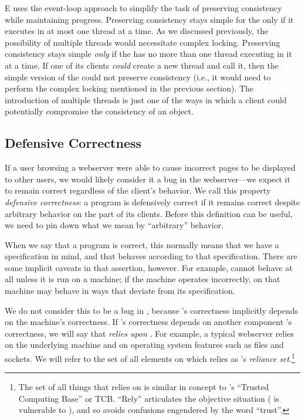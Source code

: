 \documentclass{llncs}
\begin{document}
E uses the event-loop approach to simplify the task of preserving
consistency while maintaining progress. Preserving consistency stays
simple for the  only if it executes in at most one
thread at a time.  As we discussed previously, the possibility of
multiple threads would necessitate complex locking. Preserving
consistency stays simple \emph{only} if the  has no
more than one thread executing in it at a time.  If one of its clients
\emph{could} create a new thread and call it, then the simple version
of the  could not preserve consistency (i.e., it
would need to perform the complex locking mentioned in the previous
section). The introduction of multiple threads is just one of the ways
in which a client could potentially compromise the consistency of an
object.


\subsection{Defensive Correctness}

If a user browsing a webserver were able to cause incorrect pages to
be displayed to other users, we would likely consider it a bug in the
webserver---we expect it to remain correct regardless of the client's
behavior.  We call this property \emph{defensive correctness}: a
program  is defensively correct if it remains correct despite
arbitrary behavior on the part of its clients.  Before this definition
can be useful, we need to pin down what we mean by ``arbitrary''
behavior.

When we say that a program  is correct, this normally means
that we have a specification in mind, and that  behaves
according to that specification.  There are some implicit caveats in
that assertion, however. For example,  cannot behave at all
unless it is run on a machine; if the machine operates incorrectly,
 on that machine may behave in ways that deviate from its
specification.  

We do not consider this to be a bug in , because 's
correctness implicitly depends on the machine's correctness.  If
's correctness depends on another component 's
correctness, we will say that  \emph{relies upon} .
For example, a typical webserver relies on the underlying machine and
on operating system features such as files and sockets.  We will refer
to the set of all elements on which  relies as 's
\emph{reliance set}.\footnote{
%
     The set of all things that  relies on is similar in
     concept to 's ``Trusted Computing Base'' or TCB. ``Rely''
     articulates the objective situation ( is vulnerable to
     ), and so avoids confusions engendered by the word
     ``trust''.}
\end{document}
